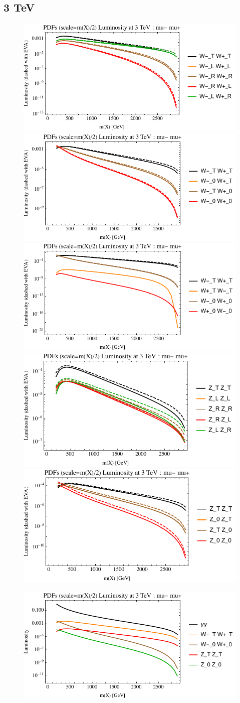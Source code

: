 \documentclass[a4paper,11pt]{article}
\begin{document}
\clearpage
\subsection{3 TeV}

\begin{figure}[ht]
\includegraphics[width=0.46\linewidth]{Notebooks/PlotLumi/3TeV/lumis/plotWWpolRandL.pdf}
\includegraphics[width=0.46\linewidth]{Notebooks/PlotLumi/3TeV/lumis/plotWWpolTand0.pdf}
\includegraphics[width=0.46\linewidth]{Notebooks/PlotLumi/3TeV/lumis/plotWmWpandWpWm.pdf}
\includegraphics[width=0.46\linewidth]{Notebooks/PlotLumi/3TeV/lumis/plotZZpolRandL.pdf}
\includegraphics[width=0.46\linewidth]{Notebooks/PlotLumi/3TeV/lumis/plotZZpolTand0.pdf}
\end{figure}

\begin{figure}
\includegraphics[width=0.46\linewidth]{Notebooks/PlotLumi/3TeV/lumis/plotgammaWZ.pdf}
\end{figure}
\end{document}
